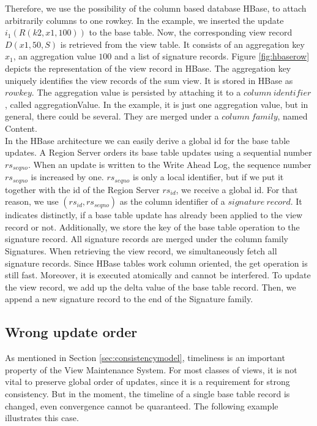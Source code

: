 \documentclass[11pt,a4paper,bibtotoc,idxtotoc,headsepline,footsepline,footexclude,BCOR12mm,DIV13]{scrbook}
\begin{document}
Therefore, we use the possibility of the column based database HBase, to attach arbitrarily columns to one rowkey. In the example, we inserted the update $i_1(R(k2,x1,100))$ to the base table. Now, the corresponding view record $D(x1,50,S)$ is retrieved from the view table. It consists of an aggregation key $x_1$, an aggregation value $100$ and a list of signature records. Figure \ref{fig:hbaserow} depicts the representation of the view record in HBase. The aggregation key uniquely identifies the view records of the sum view. It is stored in HBase as $rowkey$. The aggregation value is persisted by attaching it to a $column\:identifier$, called aggregationValue. In the example, it is just one aggregation value, but in general, there could be several. They are merged under a $column\:family$, named Content.\\ 
In the HBase architecture we can easily derive a global id for the base table updates. A Region Server orders its base table updates using a sequential number $rs_{seqno}$. When an update is written to the Write Ahead Log, the sequence number $rs_{seqno}$ is increased by one. $rs_{seqno}$ is only a local identifier, but if we put it together with the id of the Region Server $rs_{id}$, we receive a global id. For that reason, we use $(rs_{id}, rs_{seqno})$ as the column identifier of a $signature\:record$. It indicates distinctly, if a base table update has already been applied to the view record or not. Additionally, we store the key of the base table operation to the signature record. All signature records are merged under the column family Signatures. When retrieving the view record, we simultaneously fetch all signature records. Since HBase tables work column oriented, the get operation is still fast. Moreover, it is executed atomically and cannot be interfered. To update the view record, we add up the delta value of the base table record. Then, we append a new signature record to the end of the Signature family.\\

\subsection{Wrong update order} 
As mentioned in Section \ref{sec:consistencymodel}, timeliness is an important property of the View Maintenance System. For most classes of views, it is not vital to preserve global order of updates, since it is a requirement for strong consistency. But in the moment, the timeline of a single base table record is changed, even convergence cannot be quaranteed. The following example illustrates this case. 
\end{document}
